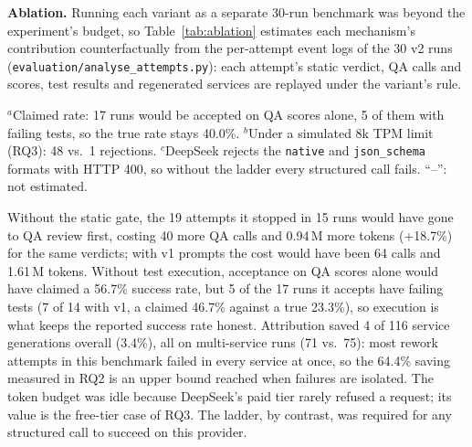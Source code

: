 \documentclass[conference,letterpaper]{IEEEtran}
\begin{document}
\textbf{Ablation.} Running each variant as a separate 30-run benchmark was beyond
the experiment's budget, so Table~\ref{tab:ablation} estimates each mechanism's
contribution counterfactually from the per-attempt event logs of the 30 v2 runs
(\texttt{evaluation/\allowbreak analyse\_attempts.py}): each attempt's static
verdict, QA calls and scores, test results and regenerated services are
replayed under the variant's rule.

\begin{table}[t]
\caption{Counterfactual Ablation on the 30 v2 Runs}
\label{tab:ablation}
\centering
\footnotesize
\setlength{\tabcolsep}{3pt}
\vspace{2pt}
\parbox{\columnwidth}{\scriptsize $^{a}$Claimed rate: 17 runs would be accepted on QA scores alone, 5 of them
with failing tests, so the true rate stays 40.0\%. $^{b}$Under a simulated 8k TPM limit (RQ3): 48 vs.\ 1
rejections. $^{c}$DeepSeek rejects the \texttt{native} and \texttt{json\_schema} formats with HTTP 400, so without
the ladder every structured call fails. ``--'': not estimated.}
\end{table}

Without the static gate, the 19 attempts it stopped in 15 runs would have gone
to QA review first, costing 40 more QA calls and 0.94\,M more tokens (+18.7\%) for
the same verdicts; with v1 prompts the cost would have been 64 calls and 1.61\,M
tokens. Without test execution, acceptance on QA scores alone would have claimed
a 56.7\% success rate, but 5 of the 17 runs it accepts have failing tests (7 of
14 with v1, a claimed 46.7\% against a true 23.3\%), so execution is what keeps
the reported success rate honest. Attribution saved 4 of 116 service generations
overall (3.4\%), all on multi-service runs (71 vs.\ 75): most rework attempts in
this benchmark failed in every service at once, so the 64.4\% saving measured in
RQ2 is an upper bound reached when failures are isolated. The token budget was
idle because DeepSeek's paid tier rarely refused a request; its value is the
free-tier case of RQ3. The ladder, by contrast, was required for any structured
call to succeed on this provider.
\end{document}
